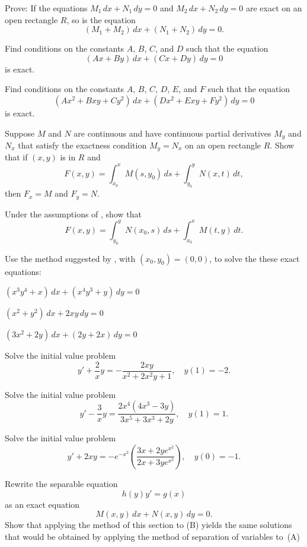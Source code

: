 \begin{exerciselist}
\item\label{exer:2.5.32}Prove:  If the equations $M_1\,dx+N_1\,dy=0$ and $M_2\,
dx+N_2\,dy=0$ are exact on an open rectangle $R$,  so is
the equation \[(M_1+M_2)\,dx+(N_1+N_2)\,dy=0.\]

\item\label{exer:2.5.33}Find conditions on the constants $A$, $B$, $C$, and $D$ such that
the equation
\[
(Ax+By)\,dx+(Cx+Dy)\,dy=0
\]
is exact.

\item\label{exer:2.5.34}Find conditions on the constants $A$, $B$, $C$, $D$, $E$, and
$F$ such that the equation
\[
(Ax^2+Bxy+Cy^2)\,dx+(Dx^2+Exy+Fy^2)\,dy=0
\]
is exact.

\item\label{exer:2.5.35}Suppose $M$ and $N$ are continuous and have continuous partial
derivatives $M_y$ and $N_x$ that satisfy the exactness condition
$M_y=N_x$ on an open rectangle $R$.
  Show that if $(x,y)$ is in $R$ and
\[
F(x,y)=\int^x_{x_0}M(s,y_0)\,ds+\int^y_{y_0}N(x,t)\,dt,
\]
then $F_x=M$ and $F_y=N$.

\item\label{exer:2.5.36}Under the assumptions of , show that
\[
F(x,y)=\int^y_{y_0}N(x_0,s)\,ds+\int^x_{x_0}M(t,y)\,dt.
\]

\item\label{exer:2.5.37}Use the method suggested by , with
$(x_0,y_0)=(0,0)$, to solve the these exact equations:
\begin{alist}
\item %
$(x^3y^4+x)\,dx+(x^4y^3+y)\,dy=0$
\item %
$(x^2+y^2)\,dx+2xy\,dy=0$
\item %
$(3x^2+2y)\,dx+(2y+2x)\,dy=0$
\end{alist}

\item\label{exer:2.5.38}Solve the initial value problem
\[
y'+\frac{2}{x}y=-\frac{2xy}{x^2+2x^2y+1},\quad y(1)=-2.
\]

\item\label{exer:2.5.39}Solve the initial value problem
\[
y'-\frac{3}{x}y=\frac{2x^4(4x^3-3y)}{3x^5+3x^3+2y},\quad y(1)=1.
\]

\item\label{exer:2.5.40}Solve the initial value problem
\[
y'+2xy=-e^{-x^2}\left(\frac{3x+2ye^{x^2}}{2x+3ye^{x^2}}\right),\quad
y(0)=-1.
\]

\item\label{exer:2.5.41}Rewrite the separable equation
\[
h(y)y'=g(x)\tag{A}
\]
as an exact equation
\[
M(x,y)\,dx+N(x,y)\,dy=0.\tag{B}
\]
Show that applying the method of this section  to
(B) yields the same solutions that would be
obtained by applying the method of separation of variables
to~(A)


\end{exerciselist}
